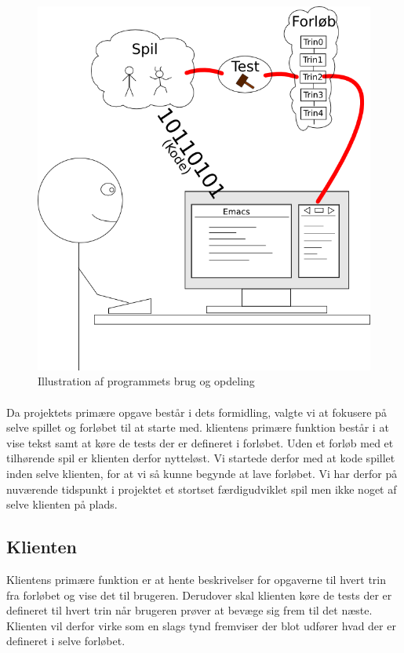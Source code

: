 \documentclass[10pt,a4paper,danish]{article}
\begin{document}
\begin{figure}[h!]
  \begin{center}
    \includegraphics[scale=0.5]{afl3_brug_og_opdeling.png}
    \caption{Illustration af programmets brug og opdeling}
    \label{fig:brug_og_opdeling}
  \end{center}
\end{figure}


\paragraph{}
Da projektets primære opgave består i dets formidling, valgte vi at fokusere på selve spillet og forløbet til at starte med. klientens primære funktion består i at vise tekst samt at køre de tests der er defineret i forløbet. Uden et forløb med et tilhørende spil er klienten derfor nytteløst.
Vi startede derfor med at kode spillet inden selve klienten, for at vi så kunne begynde at lave forløbet. Vi har derfor på nuværende tidspunkt i projektet et stortset færdigudviklet spil men ikke noget af selve klienten på plads.

\subsection{Klienten}
Klientens primære funktion er at hente beskrivelser for opgaverne til hvert trin fra forløbet og vise det til brugeren. Derudover skal klienten køre de tests der er defineret til hvert trin når brugeren prøver at bevæge sig frem til det næste. Klienten vil derfor virke som en slags tynd fremviser der blot udfører hvad der er defineret i selve forløbet.
\end{document}
